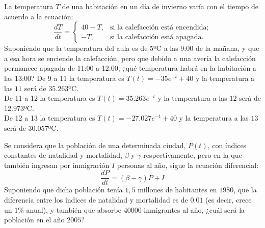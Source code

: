 {La temperatura $T$ de una habitación en un día de invierno varía con el tiempo de acuerdo a la ecuación:
\[
\frac{dT}{dt}=
\begin{cases}
40-T, & \mbox{si la calefacción está encendida;} \\
-T, & \mbox{si la calefacción está apagada.}
\end{cases}
\]
Suponiendo que la temperatura del aula es de 5ºC  a las 9:00 de la mañana, y que a esa hora se enciende la calefacción, pero que debido a una avería la calefacción permanece apagada de 11:00 a 12:00, ¿qué temperatura habrá en la habitación a las 13:00?}
{De 9 a 11 la temperatura es $T(t)=-35e^{-t}+40$ y la temperatura a las $11$ será de $35.263$ºC.\\
De 11 a 12 la temperatura es $T(t)=35.263e^{-t}$ y la temperatura a las $12$ será de $12.973$ºC.\\
De 12 a 13 la temperatura es $T(t)=-27.027e^{-t}+40$ y la temperatura a las $13$ será de $30.057$ºC.
}
{}


{Se considera que la población de una determinada ciudad, $P(t)$, con índices constantes de natalidad y mortalidad,
$\beta$ y $\gamma$ respectivamente, pero en la que también ingresan por inmigración $I$ personas al año, sigue la
ecuación diferencial:
\[
\frac{{dP}} {{dt}} = \left( {\beta  - \gamma } \right)P + I
\]
Suponiendo que dicha población tenía $1,5$ millones de habitantes en $1980$, que la diferencia entre los índices de
natalidad y mortalidad es de $0.01$ (es decir, crece un $1\%$ anual), y también que absorbe $40000$ inmigrantes al año,
¿cuál será la población en el año $2005$?}
{
}
{}


